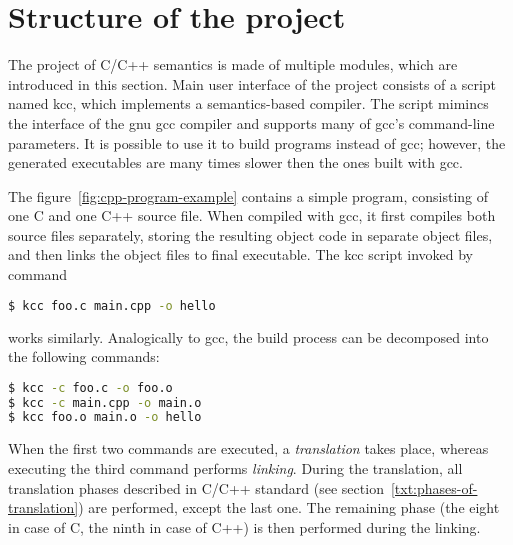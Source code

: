 \documentclass{fithesis3}
\begin{document}
\section{Structure of the project}



The project of C/C++ semantics is made of multiple modules, which are introduced in this section. 
Main user interface of the project consists of a script named kcc, which implements a semantics-based compiler. The script mimincs the interface of the gnu gcc compiler and supports many of gcc's command-line parameters. It is possible to use it to build programs instead of gcc; however, the generated executables are many times slower then the ones built with gcc.

The figure~\ref{fig:cpp-program-example} contains a simple program, consisting of one C and one C++ source file. When compiled with gcc, it first compiles both source files separately, storing the resulting object code in separate object files, and then links the object files to final executable. The kcc script invoked by command
\begin{lstlisting}[language=bash]
$ kcc foo.c main.cpp -o hello
\end{lstlisting}
works similarly. Analogically to gcc, the build process can be decomposed into the following commands:
\begin{lstlisting}[language=bash]
$ kcc -c foo.c -o foo.o
$ kcc -c main.cpp -o main.o
$ kcc foo.o main.o -o hello
\end{lstlisting}

When the first two commands are executed, a \textit{translation} takes place, whereas executing the third command performs \textit{linking}. During the translation, all translation phases described in C/C++ standard (see section~\ref{txt:phases-of-translation}) are performed, except the last one. The remaining phase (the eight in case of C, the ninth in case of C++) is then performed during the linking.
\end{document}
